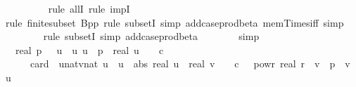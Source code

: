 \begin{isabellebody}
\ \ \ \ \ \ \ \ \isamarkupfalse%
\ {\isacharparenleft}{\kern0pt}rule\ allI{\isacharcomma}{\kern0pt}\ rule\ impI{\isacharparenright}{\kern0pt}\isanewline
\ \ \ \ \ \ \isamarkupfalse%
\ {\isacharparenleft}{\kern0pt}rule\ finite{\isacharunderscore}{\kern0pt}subset{\isacharbrackleft}{\kern0pt}\ B{\isacharequal}{\kern0pt}{\isachardoublequoteopen}{\isacharbraceleft}{\kern0pt}{}{\isachardot}{\kern0pt}{\isachardot}{\kern0pt}{\isacharless}{\kern0pt}p{\isacharbraceright}{\kern0pt}{\isasymtimes}{\isacharbraceleft}{\kern0pt}{}{\isachardot}{\kern0pt}{\isachardot}{\kern0pt}{\isacharless}{\kern0pt}p{\isacharbraceright}{\kern0pt}{\isachardoublequoteclose}{\isacharbrackright}{\kern0pt}{\isacharcomma}{\kern0pt}\ rule\ subsetI{\isacharcomma}{\kern0pt}\ simp\ add{\isacharcolon}{\kern0pt}case{\isacharunderscore}{\kern0pt}prod{\isacharunderscore}{\kern0pt}beta\ mem{\isacharunderscore}{\kern0pt}Times{\isacharunderscore}{\kern0pt}iff{\isacharcomma}{\kern0pt}\ simp{\isacharparenright}{\kern0pt}\isanewline
\ \ \ \ \ \ \ \isamarkupfalse%
\ {\isacharparenleft}{\kern0pt}rule\ subsetI{\isacharcomma}{\kern0pt}\ simp\ add{\isacharcolon}{\kern0pt}case{\isacharunderscore}{\kern0pt}prod{\isacharunderscore}{\kern0pt}beta{\isacharparenright}{\kern0pt}\isanewline
\ \ \ \ \ \ \isamarkupfalse%
\ simp\isanewline
\ \ \ \ \isamarkupfalse%
\ \isamarkupfalse%
\ {\isachardoublequoteopen}{\isachardot}{\kern0pt}{\isachardot}{\kern0pt}{\isachardot}{\kern0pt}\ {\isasymle}\ {}{\isacharslash}{\kern0pt}{\isacharparenleft}{\kern0pt}real\ p{\isacharparenright}{\kern0pt}\ {\isacharasterisk}{\kern0pt}\ {\isacharparenleft}{\kern0pt}{\isasymSum}\ u{\isacharprime}{\kern0pt}\ {\isasymin}\ {\isacharbraceleft}{\kern0pt}u{\isachardot}{\kern0pt}\ u\ {\isacharless}{\kern0pt}\ p\ {\isasymand}\ real\ u\ {\isasymle}\ {}\ {\isacharasterisk}{\kern0pt}\ c{\isacharbraceright}{\kern0pt}{\isachardot}{\kern0pt}\isanewline
\ \ \ \ \ \ card\ \ {\isacharbraceleft}{\kern0pt}{\isacharparenleft}{\kern0pt}u{\isacharcolon}{\kern0pt}{\isacharcolon}{\kern0pt}nat{\isacharcomma}{\kern0pt}v{\isacharcolon}{\kern0pt}{\isacharcolon}{\kern0pt}nat{\isacharparenright}{\kern0pt}{\isachardot}{\kern0pt}\ u\ {\isacharequal}{\kern0pt}\ u{\isacharprime}{\kern0pt}\ {\isasymand}\ abs\ {\isacharparenleft}{\kern0pt}real\ u\ {\isacharminus}{\kern0pt}\ real\ v{\isacharparenright}{\kern0pt}\ {\isasymle}\ {}\ {\isacharasterisk}{\kern0pt}\ c\ {\isacharasterisk}{\kern0pt}\ {}\ powr\ {\isacharparenleft}{\kern0pt}{\isacharminus}{\kern0pt}real\ r{\isacharparenright}{\kern0pt}\ {\isasymand}\ v\ {\isacharless}{\kern0pt}\ p\ {\isasymand}\ v\ {\isasymnoteq}\ u{\isacharprime}{\kern0pt}{\isacharbraceright}{\kern0pt}{\isacharparenright}{\kern0pt}{\isachardoublequoteclose}\isanewline

\end{isabellebody}
